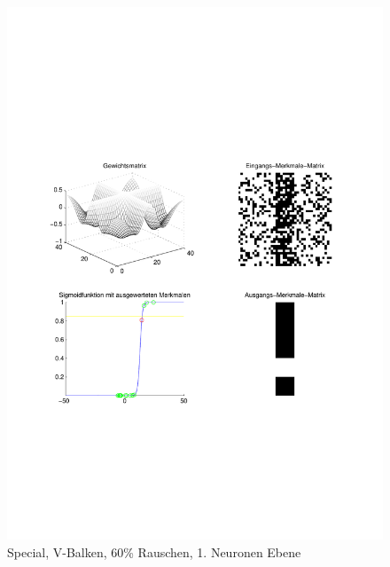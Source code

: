 \begin{figure}[hbt]
	\begin{minipage}{0.8 \textwidth}
		\includegraphics[width=\textwidth]{./Bilder/Auswertung/Endergebnis/TypeSpecial_Rauschen60_V_Line_Layer1}
		\caption{Special, V-Balken, 60\% Rauschen, 1. Neuronen Ebene}
		\label{Special_V_60_1}
	\end{minipage}
	\vfill
	\begin{minipage}{0.8 \textwidth}

\end{minipage}
\end{figure}
